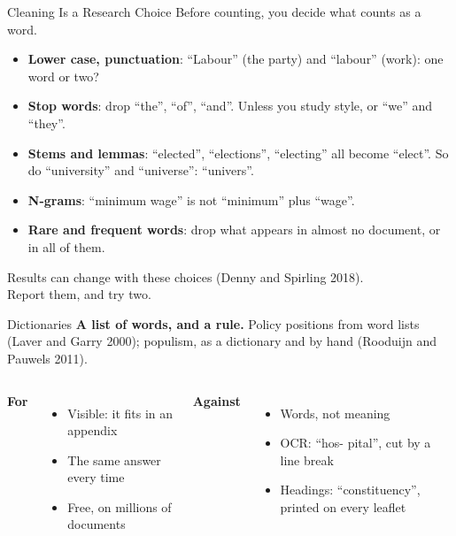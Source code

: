 \documentclass[svgnames,x11names,dvipsnames]{beamer}
\newcommand{\new}[1]{#1}
\begin{document}
\begin{frame}{\new{Cleaning Is a Research Choice}}
\small
Before counting, you decide what counts as a word.

\vspace{0.3cm}
\begin{itemize}
    \setlength{\itemsep}{5pt}
    \item \textbf{Lower case, punctuation}: \new{``Labour'' (the party) and ``labour'' (work)}: one word or two?
    \item \textbf{Stop words}: drop \new{``the'', ``of'', ``and''}. Unless you study style, or \new{``we'' and ``they''}.
    \item \textbf{Stems and lemmas}: \new{``elected'', ``elections'', ``electing'' all become ``elect''. So do ``university'' and ``universe'': ``univers''.}
    \item \textbf{N-grams}: \new{``minimum wage''} is not \new{``minimum''} plus \new{``wage''}.
    \item \textbf{Rare and frequent words}: drop what appears in almost no document, or in all of them.
\end{itemize}

\vspace{0.4cm}
\alert{Results can change with these choices (Denny and Spirling 2018).\\ Report them, and try two.}
\end{frame}

\begin{frame}{Dictionaries}
\small
\textbf{A list of words, and a rule.} Policy positions from word lists (Laver and Garry 2000); populism, as a dictionary and by hand (Rooduijn and Pauwels 2011).

\vspace{0.3cm}
\begin{columns}[T]
\textbf{For}
\begin{itemize}
    \setlength{\itemsep}{2pt}
    \item Visible: it fits in an appendix
    \item The same answer every time
    \item Free, on millions of documents
\end{itemize}
\textbf{Against}
\begin{itemize}
    \setlength{\itemsep}{2pt}
    \item Words, not meaning
    \item OCR: ``hos- pital'', cut by a line break
    \item Headings: ``constituency'', printed on every leaflet
\end{itemize}
\end{columns}
\end{frame}
\end{document}
